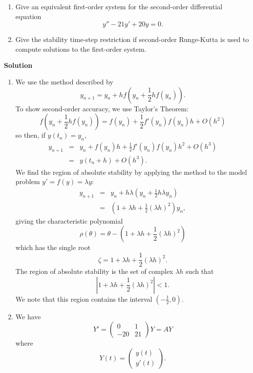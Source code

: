 \documentclass{article}
\begin{document}
\begin{enumerate}
\begin{enumerate}
\item Give an equivalent first-order system for the second-order differential equation
\[y'' - 21 y' + 20 y = 0.\]

\item Give the stability time-step restriction if second-order Runge-Kutta is used to compute solutions to the first-order system.

\end{enumerate}

{\bf Solution}

\begin{enumerate}
\item We use the method described by
\[y_{n + 1} = y_n + h f \left( y_n + \frac{1}{2} h f(y_n) \right).\]
To show second-order accuracy, we use Taylor's Theorem:
\[f \left( y_n + \frac{1}{2} h f(y_n) \right)
  = f(y_n) + \frac{1}{2} f'(y_n) f(y_n) h + O(h^2)\]
so then, if \(y(t_n) = y_n\),
\begin{eqnarray*}
y_{n + 1} & = & y_n + f(y_n) h + \frac{1}{2} f'(y_n) f(y_n) h^2 + O(h^3) \\
          & = & y(t_n + h) + O(h^3).
\end{eqnarray*}
We find the region of absolute stability by applying the method to the model problem \(y' = f(y) = \lambda y\):
\begin{eqnarray*}
y_{n + 1} & = & y_n + h \lambda \left( y_n + \frac{1}{2} h \lambda y_n \right) \\
          & = & \left( 1 + \lambda h + \frac{1}{2} (\lambda h)^2 \right) y_n,
\end{eqnarray*}
giving the characteristic polynomial
\[\rho(\theta) = \theta - \left( 1 + \lambda h + \frac{1}{2} (\lambda h)^2 \right)\]
which has the single root
\[\zeta = 1 + \lambda h + \frac{1}{2} (\lambda h)^2.\]
The region of absolute stability is the set of complex \(\lambda h\) such that
\[\left| 1 + \lambda h + \frac{1}{2} (\lambda h)^2 \right| < 1.\]
We note that this region contains the interval \(\left( -\frac{1}{2}, 0 \right)\).

\item We have
\[Y' = \left( \begin{array}{cc} 0 & 1 \\ -20 & 21 \end{array} \right) Y = A Y\]
where
\[Y(t) = \left( \begin{array}{c} y(t) \\ y'(t) \end{array} \right).\]


\end{enumerate}
\end{enumerate}
\end{document}

